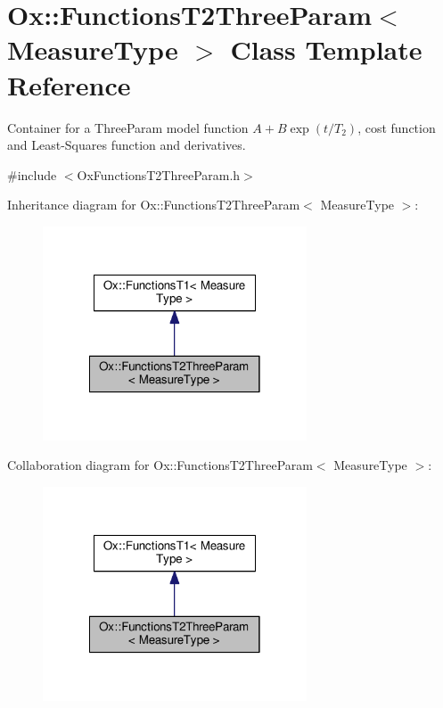 \hypertarget{class_ox_1_1_functions_t2_three_param}{\section{Ox\-:\-:Functions\-T2\-Three\-Param$<$ Measure\-Type $>$ Class Template Reference}
\label{class_ox_1_1_functions_t2_three_param}
}


Container for a Three\-Param model function $ A + B\exp(t/T_2) $, cost function and Least-\/\-Squares function and derivatives.  




{\ttfamily \#include $<$Ox\-Functions\-T2\-Three\-Param.\-h$>$}



Inheritance diagram for Ox\-:\-:Functions\-T2\-Three\-Param$<$ Measure\-Type $>$\-:
\nopagebreak
\begin{figure}[H]
\begin{center}
\leavevmode
\includegraphics[width=222pt]{class_ox_1_1_functions_t2_three_param__inherit__graph}
\end{center}
\end{figure}


Collaboration diagram for Ox\-:\-:Functions\-T2\-Three\-Param$<$ Measure\-Type $>$\-:
\nopagebreak
\begin{figure}[H]
\begin{center}
\leavevmode
\includegraphics[width=222pt]{class_ox_1_1_functions_t2_three_param__coll__graph}
\end{center}
\end{figure}
